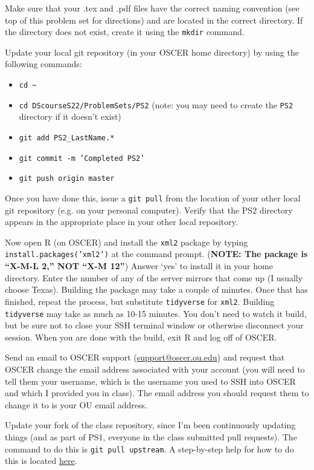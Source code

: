 \documentclass[12pt,english]{exam}
\begin{document}
\begin{questions}
\question Make sure that your .tex and .pdf files have the correct naming convention (see top of this problem set for directions) and are located in the correct directory. If the directory does not exist, create it using the \texttt{mkdir} command.

\question Update your local git repository (in your OSCER home directory) by using the following commands:
\begin{itemize}
	\item \texttt{cd \~}
    \item \texttt{cd DScourseS22/ProblemSets/PS2} (note: you may need to create the \texttt{PS2} directory if it doesn't exist)
	\item \texttt{git add PS2\_LastName.*}
	\item \texttt{git commit -m 'Completed PS2'}
	\item \texttt{git push origin master}
\end{itemize}
Once you have done this, issue a \texttt{git pull} from the location of your other local git repository (e.g. on your personal computer). Verify that the PS2 directory appears in the appropriate place in your other local repository.

\question Now open R (on OSCER) and install the \texttt{xml2} package by typing \texttt{install.packages('xml2')} at the command prompt. (\textbf{NOTE: The package is ``X-M-L 2,'' NOT ``X-M 12''}) Answer `yes' to install it in your home directory. Enter the number of any of the server mirrors that come up (I usually choose Texas). Building the package may take a couple of minutes. Once that has finished, repeat the process, but substitute \texttt{tidyverse} for \texttt{xml2}. Building \texttt{tidyverse} may take as much as 10-15 minutes. You don't need to watch it build, but be sure not to close your SSH terminal window or otherwise disconnect your session. When you are done with the build, exit R and log off of OSCER.

\question Send an email to OSCER support (\href{mailto:support@oscer.ou.edu}{support@oscer.ou.edu}) and request that OSCER change the email address associated with your account (you will need to tell them your username, which is the username you used to SSH into OSCER and which I provided you in class). The email address you should request them to change it to is your OU email address.

\question Update your fork of the class repository, since I'm been continuously updating things (and as part of PS1, everyone in the class submitted pull requests). The command to do this is \texttt{git pull upstream}. A step-by-step help for how to do this is located \href{https://help.github.com/articles/syncing-a-fork/}{here}.

\end{questions}
\end{document}
